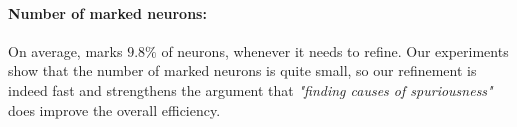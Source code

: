 \paragraph{Number of marked neurons: }
On average, \drefine{} marks $9.8\%$ of neurons, whenever it needs to refine. 
Our experiments show that the number of marked neurons is quite small, so our refinement is indeed fast and strengthens the argument that {\em "finding causes of spuriousness"} does improve the overall efficiency. 








